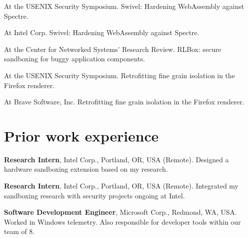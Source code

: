\documentclass[10pt, letterpaper]{moderncv}
\begin{document}
{ At the USENIX Security Symposium. Swivel: Hardening WebAssembly against
Spectre. }

{ At Intel Corp. Swivel: Hardening WebAssembly against Spectre. }


{ At the Center for Networked Systems' Research Review. RLBox: secure sandboxing for buggy application
components.  }

{ At the USENIX Security Symposium. Retrofitting fine grain isolation in the
Firefox renderer. }

{ At Brave Software, Inc. Retrofitting fine grain isolation in the Firefox
renderer. }

\section{Prior work experience}

%
{{\textbf{Research Intern}, Intel Corp., Portland, OR, USA (Remote).}
%
{\hfill \newline Designed a hardware sandboxing extension based on my research.}}

%
{{\textbf{Research Intern}, Intel Corp., Portland, OR, USA (Remote).}
%
{\hfill \newline Integrated my sandboxing research with security projects
ongoing at Intel.}}

%
{{\textbf{Software Development Engineer}, Microsoft Corp., Redmond, WA, USA.}
%
{\hfill \newline Worked in Windows telemetry. Also responsible for developer
tools within our team of 8.}}
\end{document}
